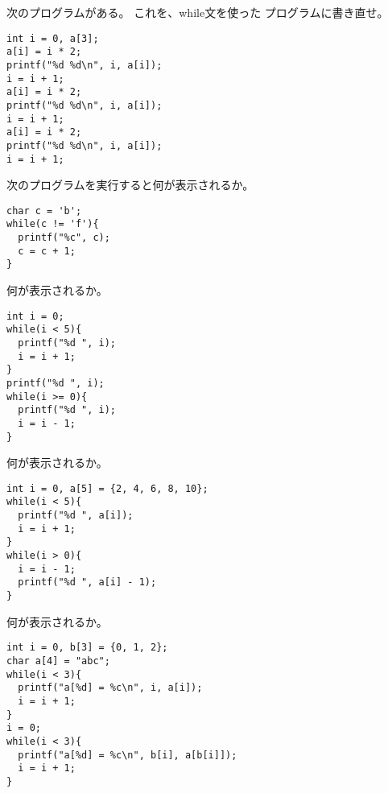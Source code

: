 \documentclass[12pt,a4j]{jarticle}
\newcounter{toi}
\def\toi{%
\bigskip\bigskip\noindent
\addtocounter{toi}{1}
\shadowbox{\bfseries\large 問\thetoi}
\nopagebreak[4]\bigskip\nopagebreak[4]
}
\begin{document}
次のプログラムがある。
これを、{\ttfamily while}文を使った
プログラムに書き直せ。

\begin{verbatim}
int i = 0, a[3];
a[i] = i * 2;
printf("%d %d\n", i, a[i]);
i = i + 1;
a[i] = i * 2;
printf("%d %d\n", i, a[i]);
i = i + 1;
a[i] = i * 2;
printf("%d %d\n", i, a[i]);
i = i + 1;
\end{verbatim}


\vspace{3cm}




\toi

次のプログラムを実行すると何が表示されるか。
\begin{verbatim}
char c = 'b';
while(c != 'f'){
  printf("%c", c);
  c = c + 1;
}
\end{verbatim}



\toi

何が表示されるか。
\begin{verbatim}
int i = 0;
while(i < 5){
  printf("%d ", i);
  i = i + 1;
}
printf("%d ", i);
while(i >= 0){
  printf("%d ", i);
  i = i - 1;
}
\end{verbatim}




\toi


何が表示されるか。
\begin{verbatim}
int i = 0, a[5] = {2, 4, 6, 8, 10};
while(i < 5){
  printf("%d ", a[i]);
  i = i + 1;
}
while(i > 0){
  i = i - 1;
  printf("%d ", a[i] - 1);
}
\end{verbatim}





\toi


何が表示されるか。
\begin{verbatim}
int i = 0, b[3] = {0, 1, 2};
char a[4] = "abc";
while(i < 3){
  printf("a[%d] = %c\n", i, a[i]);
  i = i + 1;
}
i = 0;
while(i < 3){
  printf("a[%d] = %c\n", b[i], a[b[i]]);
  i = i + 1;
}
\end{verbatim}
\end{document}
